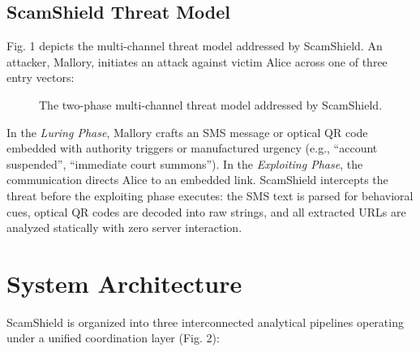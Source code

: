 \documentclass[conference]{IEEEtran}
\begin{document}
\subsection{ScamShield Threat Model}
Fig. 1 depicts the multi-channel threat model addressed by ScamShield. An attacker, Mallory, initiates an attack against victim Alice across one of three entry vectors:
\begin{figure}[htbp]
\centerline{}
\caption{The two-phase multi-channel threat model addressed by ScamShield.}
\label{fig:threat_model}
\end{figure}

In the \textit{Luring Phase}, Mallory crafts an SMS message or optical QR code embedded with authority triggers or manufactured urgency (e.g., ``account suspended'', ``immediate court summons''). In the \textit{Exploiting Phase}, the communication directs Alice to an embedded link. ScamShield intercepts the threat before the exploiting phase executes: the SMS text is parsed for behavioral cues, optical QR codes are decoded into raw strings, and all extracted URLs are analyzed statically with zero server interaction.

\section{System Architecture}
ScamShield is organized into three interconnected analytical pipelines operating under a unified coordination layer (Fig. 2):
\end{document}

